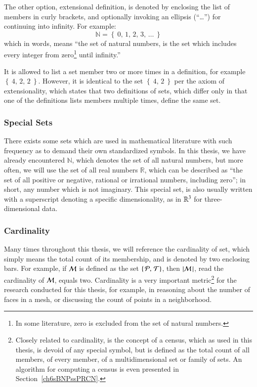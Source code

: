 The other option, extensional definition, is denoted by enclosing the list of members in curly brackets, and optionally invoking an ellipsis (``\dots'') for continuing into infinity. For example:
%
\begin{equation}
	\mathbb{N} = \left \{\:0,\,1,\,2,\,3,\,\ldots\:\right \}
\end{equation}
%
which in words, means ``the set of natural numbers, is the set which includes every integer from zero\footnote{In some literature, zero is excluded from the set of natural numbers.} until infinity.''

It is allowed to list a set member two or more times in a definition, for example $\left \{\:4,\,2,\,2\:\right \}$. However, it is identical to the set $\left \{\:4,\,2\:\right \}$ per the axiom of extensionality, which states that two definitions of sets, which differ only in that one of the definitions lists members multiple times, define the same set.

%
%
\subsubsection{Special Sets}
\label{ch2sETBssSTsssSS}
There exists some sets which are used in mathematical literature with such frequency as to demand their own standardized symbols. In this thesis, we have already encountered $\mathbb{N}$, which denotes the set of all natural numbers, but more often, we will use the set of all real numbers $\mathbb{R}$, which can be described as ``the set of all positive or negative, rational or irrational numbers, including zero''; in short, any number which is not imaginary. This special set, is also usually written with a superscript denoting a specific dimensionality, as in $\mathbb{R}^{3}$ for three-dimensional data.

%
%
\subsubsection{Cardinality}
\label{ch2sETBssSTsssC}
Many times throughout this thesis, we will reference the cardinality of set, which simply means the total count of its membership, and is denoted by two enclosing bars. For example, if $\mathcal{M}$ is defined as the set $\left \{\,\mathcal{P},\,\mathcal{T}\right \}$, then $|\mathcal{M}\,| $, read the cardinality of $\mathcal{M}$, equals two. Cardinality is a very important metric\footnote{Closely related to cardinality, is the concept of a census, which as used in this thesis, is devoid of any special symbol, but is defined as the total count of all members, of every member, of a multidimensional set or family of sets. An algorithm for computing a census is even presented in Section~\ref{ch6sBNPssPRCN}.} for the research conducted for this thesis, for example, in reasoning about the number of faces in a mesh, or discussing the count of points in a neighborhood. 

